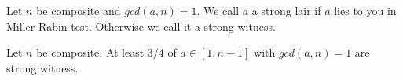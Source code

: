 \begin{defn}
Let $n$ be composite and $gcd(a,n) = 1$. We call $a$ a strong lair if $a$ lies to you in Miller-Rabin test. Otherwise we call it a strong witness.
\end{defn}

\begin{prop}
Let $n$ be composite. At least $3/4$ of $a\in [1,n-1]$ with $gcd(a,n) = 1$ are strong witness.
\end{prop}

